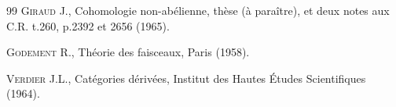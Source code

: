 \documentclass[10pt]{../fichiers-configuration-latex/smfart}
\begin{document}
\begin{thebibliography}{99}
 \textsc{Giraud} J., Cohomologie non-abélienne, thèse (à
paraître), et deux notes aux C.R. t.260, p.2392 et 2656 (1965).

 \textsc{Godement} R., Théorie des faisceaux, Paris (1958).

 \textsc{Verdier} J.L., Catégories dérivées, Institut des
Hautes Études Scientifiques (1964).
\end{thebibliography}

\ifx\danslelivre\undefined
\end{document}
